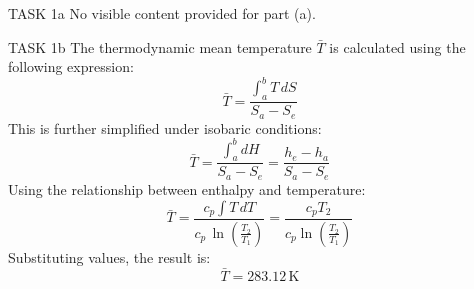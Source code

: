 TASK 1a  
No visible content provided for part (a).  

TASK 1b  
The thermodynamic mean temperature \( \bar{T} \) is calculated using the following expression:  
\[
\bar{T} = \frac{\int_a^b T \, dS}{S_a - S_e}
\]  
This is further simplified under isobaric conditions:  
\[
\bar{T} = \frac{\int_a^b dH}{S_a - S_e} = \frac{h_e - h_a}{S_a - S_e}
\]  
Using the relationship between enthalpy and temperature:  
\[
\bar{T} = \frac{c_p \int T \, dT}{c_p \, \ln\left(\frac{T_2}{T_1}\right)} = \frac{c_p T_2}{c_p \ln\left(\frac{T_2}{T_1}\right)}
\]  
Substituting values, the result is:  
\[
\bar{T} = 283.12 \, \text{K}
\]